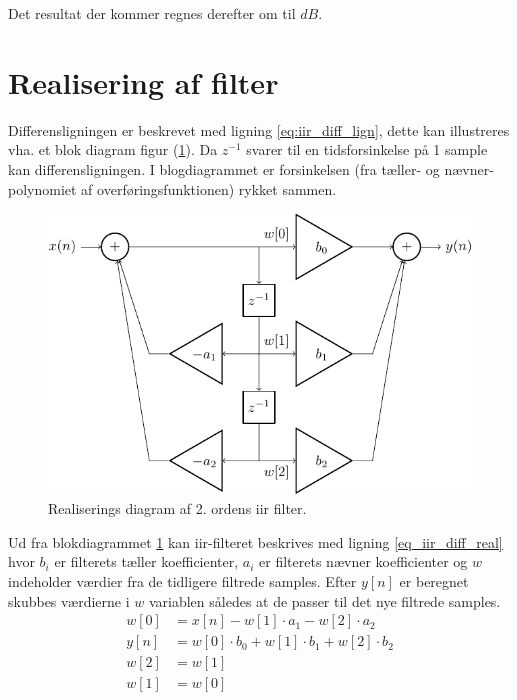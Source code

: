 Det resultat der kommer regnes derefter om til $dB$.



\section{Realisering af filter}

Differensligningen er beskrevet med ligning \ref{eq:iir_diff_lign}, dette kan illustreres vha. et blok diagram figur (\ref{fig:real_diag}). 
Da $z^{-1}$ svarer til en tidsforsinkelse på 1 sample kan differensligningen. I blogdiagrammet er forsinkelsen 
(fra tæller- og nævner-polynomiet af overføringsfunktionen) rykket sammen.

   \begin{figure}[h]
        \centering
        \includegraphics[scale = 0.8]{figure/iir_sos-crop.pdf}
        \caption{Realiserings diagram af 2. ordens iir filter. }    
        \label{fig:real_diag}
    \end{figure}
   Ud fra blokdiagrammet \ref{fig:real_diag} kan iir-filteret beskrives med ligning \ref{eq_iir_diff_real} 
   hvor $b_i$ er filterets tæller koefficienter, $a_i$ er filterets nævner koefficienter og $w$ indeholder 
   værdier fra de tidligere filtrede samples. Efter $y[n]$ er beregnet skubbes værdierne i $w$ variablen  
 således at de passer til det nye filtrede samples. 
    \begin{align}
        w[0] &=x[n] - w[1] \cdot a_1 - w[2] \cdot a_2 \\
        y[n] &= w[0] \cdot b_0 + w[1] \cdot b_1 + w[2] \cdot b_2
        \label{eq:iir_diff_real}
        \\
        w[2] &= w[1] \\
        w[1] &= w[0]
    \end{align}

